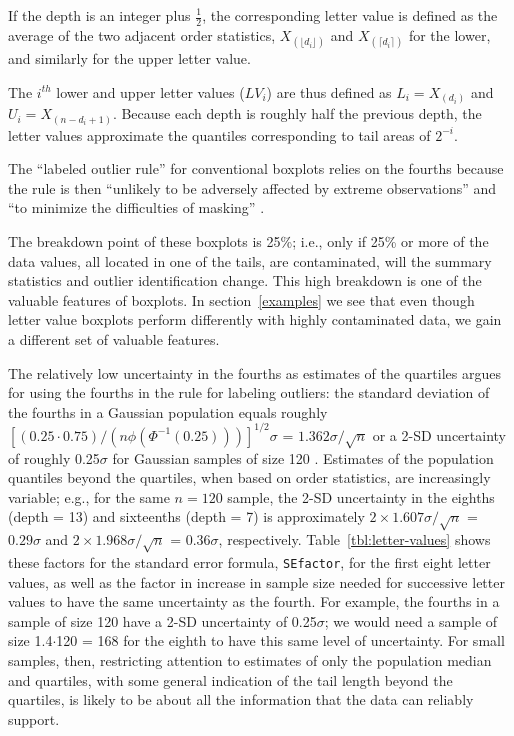 \documentclass[12pt,oneside]{article}
\begin{document}
If the depth is an integer plus $\frac{1}{2}$,  the corresponding letter value is defined as the average of the two adjacent order statistics, $X_{(\lfloor d_i \rfloor)}$ and $X_{(\lceil d_i \rceil)}$ for the lower, and similarly for the upper letter value.

The $i^{th}$ lower and upper letter values ($LV_i$) are thus defined as $L_i = X_{(d_i)}$ and $U_i = X_{(n - d_i + 1)}$. 
Because each depth is roughly half the previous depth, the letter values approximate the quantiles corresponding to tail areas of $2^{-i}$.

The ``labeled outlier rule'' for conventional boxplots relies on the fourths because the rule is then ``unlikely to be adversely affected by extreme observations'' and ``to minimize the difficulties of masking'' \citep[pg. 992]{dchbox}. 

The breakdown point of these boxplots is 25\%; i.e., only if 25\% or more of the data values, all located in one of the tails, are contaminated, will the summary statistics and outlier identification change. This high breakdown is one of the valuable features of boxplots. In section~\ref{examples} we see that even though  letter value boxplots  perform differently with highly contaminated data, we gain a different set of valuable features.

The relatively low uncertainty in the fourths as estimates of the quartiles argues for using the fourths in the rule for labeling outliers: the standard deviation of the fourths in a Gaussian population equals roughly $[(0.25 \cdot 0.75) / (n \phi(\Phi^{-1}(0.25)))]^{1/2} \sigma$ = $1.362 \sigma / \sqrt{n}$ or a 2-SD uncertainty of roughly 0.25$\sigma$ for Gaussian samples of size 120 \citep{ha.order}. Estimates of the population quantiles beyond the quartiles, when based on order statistics, are increasingly variable; e.g., for the same $n = 120$ sample, the 2-SD uncertainty in the eighths (depth = 13) and sixteenths (depth = 7) is approximately $ 2 \times 1.607 \sigma / \sqrt{n}$ = $0.29 \sigma$ and $ 2 \times 1.968 \sigma / \sqrt{n}$ = $0.36 \sigma$, respectively. Table~\ref{tbl:letter-values} shows these factors for the standard error formula, \texttt{SEfactor}, for the first eight letter values, as well as the factor in increase in sample size needed for successive letter values to have the same uncertainty as the fourth. 
For example, the fourths in a sample of size 120 have a 2-SD uncertainty of 0.25$\sigma$; we would need a sample of size 1.4$\cdot$120 = 168 for the eighth to have this same level of uncertainty.
For small samples, then, restricting attention to estimates of only the population median and quartiles, with some general indication of the tail length beyond the quartiles, is likely to be about all the information that the data can reliably support.
\end{document}
